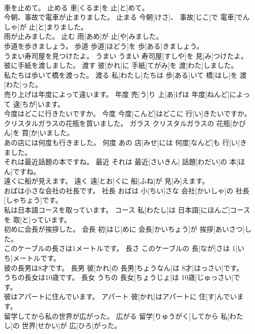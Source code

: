 \documentclass[8pt]{extreport}
\begin{document}
\begin{CJK}{UTF8}{min}
\\	車を止めて。	止める	車[くるま]を 止[と]めて。	
\\	今朝、事故で電車が止まりました。	止まる	今朝[けさ]、 事故[じこ]で 電車[でんしゃ]が 止[と]まりました。	
\\	雨が止みました。	止む	雨[あめ]が 止[や]みました。	
\\	歩道を歩きましょう。	歩道	歩道[ほどう]を 歩[ある]きましょう。	
\\	うまい寿司屋を見つけたよ。	うまい	うまい 寿司屋[すしや]を 見[み]つけたよ。	
\\	彼に手紙を渡しました。	渡す	彼[かれ]に 手紙[てがみ]を 渡[わた]しました。	
\\	私たちは歩いて橋を渡った。	渡る	私[わたし]たちは 歩[ある]いて 橋[はし]を 渡[わた]った。	
\\	売り上げは年度によって違います。	年度	売[う]り 上[あ]げは 年度[ねんど]によって 違[ちが]います。	
\\	今度はどこに行きたいですか。	今度	今度[こんど]はどこに 行[い]きたいですか。	
\\	クリスタルガラスの花瓶を買いました。	ガラス	クリスタルガラスの 花瓶[かびん]を 買[か]いました。	
\\	あの店には何度も行きました。	何度	あの 店[みせ]には 何度[なんど]も 行[い]きました。	
\\	それは最近話題の本ですね。	最近	それは 最近[さいきん] 話題[わだい]の 本[ほん]ですね。	
\\	遠くに船が見えます。	遠く	遠[とお]くに 船[ふね]が 見[み]えます。	
\\	おばは小さな会社の社長です。	社長	おばは 小[ちい]さな 会社[かいしゃ]の 社長[しゃちょう]です。	
\\	私は日本語コースを取っています。	コース	私[わたし]は 日本語[にほんご]コースを 取[と]っています。	
\\	初めに会長が挨拶した。	会長	初[はじ]めに 会長[かいちょう]が 挨拶[あいさつ]した。	
\\	このケーブルの長さは1メートルです。	長さ	このケーブルの 長[なが]さは 1[いち]メートルです。	
\\	彼の長男は8才です。	長男	彼[かれ]の 長男[ちょうなん]は 8才[はっさい]です。	
\\	うちの長女は10歳です。	長女	うちの 長女[ちょうじょ]は 10歳[じゅっさい]です。	
\\	彼はアパートに住んでいます。	アパート	彼[かれ]はアパートに 住[す]んでいます。	
\\	留学してから私の世界が広がった。	広がる	留学[りゅうがく]してから 私[わたし]の 世界[せかい]が 広[ひろ]がった。	

\end{CJK}
\end{document}
